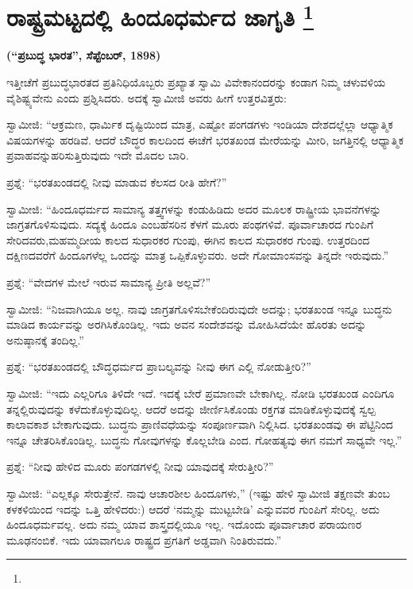 
\chapter[ರಾಷ್ಟ್ರಮಟ್ಟದಲ್ಲಿ ಹಿಂದೂಧರ್ಮದ ಜಾಗೃತಿ ]{ರಾಷ್ಟ್ರಮಟ್ಟದಲ್ಲಿ ಹಿಂದೂಧರ್ಮದ ಜಾಗೃತಿ \protect\footnote{}}

\centerline{\textbf{(“ಪ್ರಬುದ್ಧ ಭಾರತ”, ಸೆಪ್ಟೆಂಬರ್​, 1898)}}

ಇತ್ತೀಚೆಗೆ ಪ್ರಬುದ್ಧಭಾರತದ ಪ್ರತಿನಿಧಿಯೊಬ್ಬರು ಪ್ರಖ್ಯಾತ ಸ್ವಾಮಿ ವಿವೇಕಾನಂದರನ್ನು ಕಂಡಾಗ ನಿಮ್ಮ ಚಳುವಳಿಯ ವೈಶಿಷ್ಟ್ಯವೇನು ಎಂದು ಪ್ರಶ್ನಿಸಿದರು. ಅದಕ್ಕೆ ಸ್ವಾಮೀಜಿ ಅವರು ಹೀಗೆ ಉತ್ತರವಿತ್ತರು:

ಸ್ವಾಮೀಜಿ: “ಆಕ್ರಮಣ, ಧಾರ್ಮಿಕ ದೃಷ್ಟಿಯಿಂದ ಮಾತ್ರ, ಎಷ್ಟೋ ಪಂಗಡಗಳು ಇಂಡಿಯಾ ದೇಶದಲ್ಲೆಲ್ಲಾ ಆಧ್ಯಾತ್ಮಿಕ ವಿಷಯಗಳನ್ನು ಹರಡಿವೆ. ಆದರೆ ಬೌದ್ಧರ ಕಾಲದಿಂದ ಈಚೆಗೆ ಭರತಖಂಡ ಮೇರೆಯನ್ನು ಮೀರಿ, ಜಗತ್ತಿನಲ್ಲಿ ಆಧ್ಯಾತ್ಮಿಕ ಪ್ರವಾಹವನ್ನು\break ಹರಿಸುತ್ತಿರುವುದು ಇದೇ ಮೊದಲ ಬಾರಿ.

ಪ್ರಶ್ನೆ: “ಭರತಖಂಡದಲ್ಲಿ ನೀವು ಮಾಡುವ ಕೆಲಸದ ರೀತಿ ಹೇಗೆ?”

ಸ್ವಾಮೀಜಿ: “ಹಿಂದೂಧರ್ಮದ ಸಾಮಾನ್ಯ ತತ್ತ್ವಗಳನ್ನು ಕಂಡುಹಿಡಿದು ಅದರ ಮೂಲಕ ರಾಷ್ಟ್ರೀಯ ಭಾವನೆಗಳನ್ನು ಜಾಗ್ರತಗೊಳಿಸುವುದು. ಸದ್ಯಕ್ಕೆ ಹಿಂದೂ ಎಂಬ\break ಹೆಸರಿನ ಕೆಳಗೆ ಮೂರು ಪಂಥಗಳಿವೆ. ಪೂರ್ವಾಚಾರದ ಗುಂಪಿಗೆ ಸೇರಿದವರು,\break ಮಹಮ್ಮದೀಯ ಕಾಲದ ಸುಧಾರಕರ ಗುಂಪು, ಈಗಿನ ಕಾಲದ ಸುಧಾರಕರ ಗುಂಪು. ಉತ್ತರದಿಂದ ದಕ್ಷಿಣದವರೆಗೆ ಹಿಂದೂಗಳೆಲ್ಲ ಒಂದನ್ನು ಮಾತ್ರ ಒಪ್ಪಿಕೊಳ್ಳುವರು. ಅದೇ ಗೋಮಾಂಸವನ್ನು ತಿನ್ನದೇ ಇರುವುದು.”

ಪ್ರಶ್ನೆ: “ವೇದಗಳ ಮೇಲೆ ಇರುವ ಸಾಮಾನ್ಯ ಪ್ರೀತಿ ಅಲ್ಲವೆ?”

ಸ್ವಾಮೀಜಿ: “ನಿಜವಾಗಿಯೂ ಅಲ್ಲ. ನಾವು ಜಾಗ್ರತಗೊಳಿಸಬೇಕೆಂದಿರುವುದೇ ಅದನ್ನು; ಭರತಖಂಡ ಇನ್ನೂ ಬುದ್ಧನು ಮಾಡಿದ ಕಾರ್ಯವನ್ನು ಅರಗಿಸಿಕೊಂಡಿಲ್ಲ. ಇದು ಅವನ ಸಂದೇಶವನ್ನು ಮೋಹಿಸಿದೆಯೇ ಹೊರತು ಅದನ್ನು ಅನುಷ್ಠಾನಕ್ಕೆ ತಂದಿಲ್ಲ.”

ಪ್ರಶ್ನೆ: “ಭರತಖಂಡದಲ್ಲಿ ಬೌದ್ಧಧರ್ಮದ ಪ್ರಾಬಲ್ಯವನ್ನು ನೀವು ಈಗ ಎಲ್ಲಿ ನೋಡುತ್ತೀರಿ?”

ಸ್ವಾಮೀಜಿ: “ಇದು ಎಲ್ಲರಿಗೂ ತಿಳಿದೇ ಇದೆ. ಇದಕ್ಕೆ ಬೇರೆ ಪ್ರಮಾಣವೇ ಬೇಕಾಗಿಲ್ಲ. ನೋಡಿ ಭರತಖಂಡ ಎಂದಿಗೂ ತನ್ನಲ್ಲಿರುವುದನ್ನು ಕಳೆದುಕೊಳ್ಳುವುದಿಲ್ಲ. ಆದರೆ ಅದನ್ನು ಜೀರ್ಣಿಸಿಕೊಂಡು ರಕ್ತಗತ ಮಾಡಿಕೊಳ್ಳುವುದಕ್ಕೆ ಸ್ವಲ್ಪ ಕಾಲಾವಕಾಶ ಬೇಕಾಗುವುದು. ಬುದ್ಧನು ಪ್ರಾಣಿವಧೆಯನ್ನು ಸಂಪೂರ್ಣವಾಗಿ ನಿಲ್ಲಿಸಿದ. ಭರತಖಂಡವು ಈ ಪೆಟ್ಟಿನಿಂದ ಇನ್ನೂ ಚೇತರಿಸಿಕೊಂಡಿಲ್ಲ. ಬುದ್ಧನು ಗೋವುಗಳನ್ನು ಕೊಲ್ಲಬೇಡಿ ಎಂದ. ಗೋಹತ್ಯವು ಈಗ ನಮಗೆ ಸಾಧ್ಯವೇ ಇಲ್ಲ.”

ಪ್ರಶ್ನೆ: “ನೀವು ಹೇಳಿದ ಮೂರು ಪಂಗಡಗಳಲ್ಲಿ ನೀವು ಯಾವುದಕ್ಕೆ ಸೇರುತ್ತೀರಿ?”

ಸ್ವಾಮೀಜಿ: “ಎಲ್ಲಕ್ಕೂ ಸೇರುತ್ತೇನೆ. ನಾವು ಆಚಾರಶೀಲ ಹಿಂದೂಗಳು,” (ಇಷ್ಟು ಹೇಳಿ ಸ್ವಾಮೀಜಿ ತಕ್ಷಣವೇ ತುಂಬ ಕಳಕಳಿಯಿಂದ ಇದನ್ನು ಒತ್ತಿ ಹೇಳಿದರು:) ಆದರೆ ‘ನಮ್ಮನ್ನು ಮುಟ್ಟಬೇಡಿ’ ಎನ್ನುವವರ ಗುಂಪಿಗೆ ಸೇರಿಲ್ಲ. ಅದು ಹಿಂದೂಧರ್ಮವಲ್ಲ. ಅದು ನಮ್ಮ ಯಾವ ಶಾಸ್ತ್ರದಲ್ಲಿಯೂ ಇಲ್ಲ. ಇದೊಂದು ಪೂರ್ವಾಚಾರ ಪರಾಯಣರ ಮೂಢನಂಬಿಕೆ. ಇದು ಯಾವಾಗಲೂ ರಾಷ್ಟ್ರದ ಪ್ರಗತಿಗೆ ಅಡ್ಡವಾಗಿ ನಿಂತಿರುವದು.”

